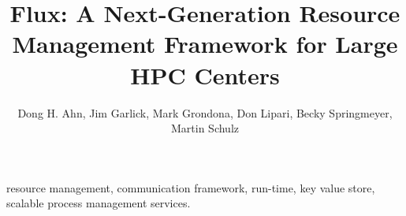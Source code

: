 \documentclass[conference]{IEEEtran}
\begin{document}
\title{Flux: A Next-Generation Resource Management Framework for Large HPC Centers}
\author{Dong H. Ahn, Jim Garlick, Mark Grondona, Don Lipari, Becky Springmeyer, Martin Schulz}

\date{}
\maketitle


\newcommand{\flux}{Flux\xspace}
\newcommand{\zMQ}{\O{}MQ}



\begin{IEEEkeywords}
resource management, communication framework, run-time, key value store, 
scalable process management services.
\end{IEEEkeywords}







%

%






\end{document}
